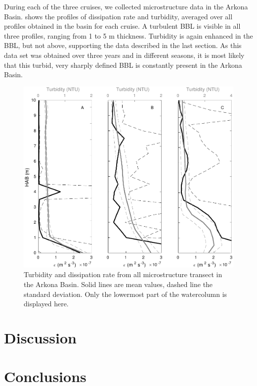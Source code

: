 During each of the three cruises, we collected microstructure data in the 
Arkona Basin.  shows the profiles of dissipation rate and turbidity, 
averaged over all profiles obtained in the basin for each cruise. A turbulent 
BBL is visible in all three profiles, ranging from 1 to 5 m thickness. 
Turbidity is again enhanced in the BBL, but not above, supporting the data 
described in the last section. As this data set was obtained over three years 
and in different seasons, it is most likely that this turbid, very sharply 
defined BBL is constantly present in the Arkona Basin.
   \begin{figure}[ht]
\includegraphics[width=15cm]{bilder/arkona_mss.pdf}
 \caption{Turbidity and dissipation rate from all microstructure transect in 
the Arkona Basin. Solid lines are mean values, dashed line the standard 
deviation. Only the lowermost part of the watercolumn is displayed here.}
 \label{abmss}
 \end{figure}
 
\section{Discussion}

\section{Conclusions}